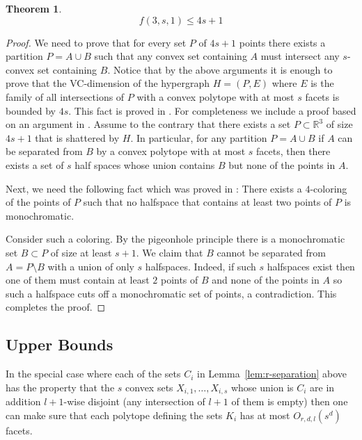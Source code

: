 \documentclass[11pt]{article}
\def\Re{\mathbb R}
\theoremstyle{plain}
\newtheorem{theorem}{Theorem}[section]
\theoremstyle{definition}
\theoremstyle{remark}
\begin{document}
\begin{theorem}
    $$f(3,s,1) \leq 4s+1$$
\end{theorem}

\begin{proof}
    We need to prove that for every set $P$ of $4s+1$ points there
    exists a partition $P=A\cup B$ such that any convex set containing
    $A$ must intersect any $s$-convex set containing $B$. Notice that by
    the above arguments it is enough to prove that the VC-dimension of the
    hypergraph $H=(P,E)$ where $E$ is the family of all intersections of
    $P$ with a convex polytope with at most $s$ facets is bounded by $4s$. This fact is proved in \cite{DG1995}. For completeness we include a proof based on an argument in \cite{smoro}.
    Assume to the contrary that there exists a set $P \subset \Re^3$
    of size $4s+1$ that is shattered by $H$. In particular, for any
    partition $P=A \cup B$ if $A$ can be separated from $B$ by a convex
    polytope with at most $s$ facets, then there exists a set of $s$
    half spaces whose union contains $B$ but none of the points in $A$.

    Next, we need the following fact which was proved in \cite{smoro}:
    There exists a $4$-coloring of the points of $P$ such that no
    halfspace that contains at least two points of $P$ is monochromatic.

    Consider such a coloring. By the pigeonhole principle there is a
    monochromatic set $B \subset P$ of size at least $s+1$. We claim that
    $B$ cannot be separated from $A=P\setminus B$ with a union of only
    $s$ halfspaces. Indeed, if such $s$ halfspaces exist then one of
    them must contain at least $2$ points of $B$ and none of the points
    in $A$ so such a halfspace cuts off a monochromatic set of points,
    a contradiction. This completes the proof.

\end{proof}

\subsection{Upper Bounds}
\label{sec:bounded-overlap}
In the special case where each of the sets $C_i$ in Lemma~\ref{lem:r-separation} above has the property that the $s$ convex sets $X_{i,1},\ldots, X_{i,s}$ whose union is $C_i$ are in addition $l+1$-wise disjoint (any 
 intersection of $l+1$ of them is empty) then one can make sure that 
 each polytope defining the sets $K_i$ has at most 
 $O_{r,d,l}(s^{d})$ facets.
 
\end{document}
